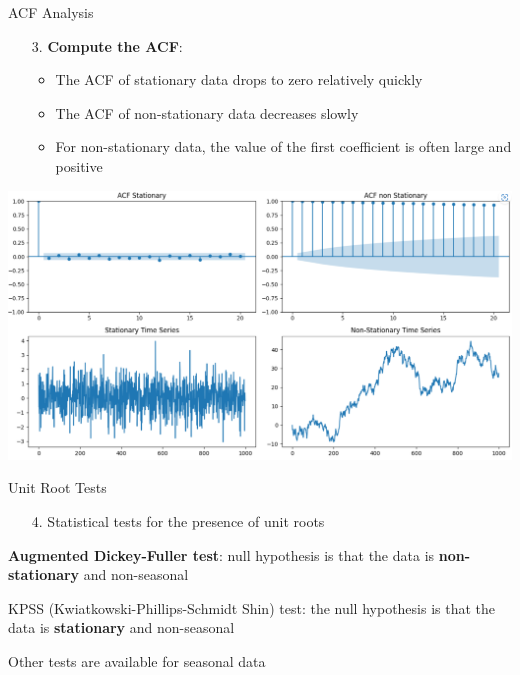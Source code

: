 \documentclass{beamer}
\newenvironment{wideenumerate}{\enumerate\addtolength{\itemsep}{10pt}}{\endenumerate}
\begin{document}
\begin{frame}{ACF Analysis}
    \begin{enumerate}
    \item[3.] \textbf{Compute the ACF}:
    \begin{itemize}
        \item The ACF of stationary data drops to zero relatively quickly
        \item The ACF of non-stationary data decreases slowly
        \item For non-stationary data, the value of the first coefficient is often large and positive
    \end{itemize}
\end{enumerate}
\includegraphics[width=\textwidth]{static/course_2_img/acf_stationary_nonstationary.PNG}  
\end{frame}

\begin{frame}{Unit Root Tests}
\begin{enumerate}
    \item[4.] Statistical tests for the presence of unit roots
\end{enumerate}
  
  \smallskip

  \begin{wideenumerate}
    \item \textbf{Augmented Dickey-Fuller test}: null hypothesis is that the data is \textbf{non-stationary} and non-seasonal
    \item KPSS (Kwiatkowski-Phillips-Schmidt Shin) test: the null hypothesis is that the data is \textbf{stationary} and non-seasonal
    \item Other tests are available for seasonal data
  \end{wideenumerate}
   
\end{frame}
\end{document}
